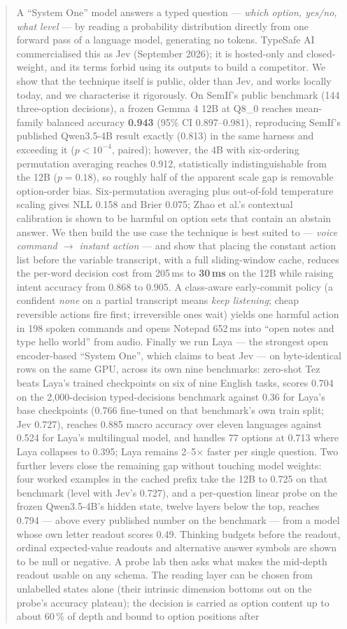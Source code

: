 \documentclass[11pt,a4paper]{article}
\begin{document}
\begin{abstract}
A ``System One'' model answers a typed question --- \emph{which option, yes/no, what level} --- by reading a probability distribution directly from one forward pass of a language model, generating no tokens. TypeSafe AI commercialised this as Jev (September 2026); it is hosted-only and closed-weight, and its terms forbid using its outputs to build a competitor. We show that the technique itself is public, older than Jev, and works locally today, and we characterise it rigorously. On SemIf's public benchmark (144 three-option decisions), a frozen Gemma 4 12B at Q8\_0 reaches mean-family balanced accuracy \textbf{0.943} (95\% CI 0.897--0.981), reproducing SemIf's published Qwen3.5-4B result exactly (0.813) in the same harness and exceeding it ($p<10^{-4}$, paired); however, the 4B with six-ordering permutation averaging reaches 0.912, statistically indistinguishable from the 12B ($p=0.18$), so roughly half of the apparent scale gap is removable option-order bias. Six-permutation averaging plus out-of-fold temperature scaling gives NLL 0.158 and Brier 0.075; Zhao et al.'s contextual calibration is shown to be harmful on option sets that contain an abstain answer. We then build the use case the technique is best suited to --- \emph{voice command $\to$ instant action} --- and show that placing the constant action list before the variable transcript, with a full sliding-window cache, reduces the per-word decision cost from 205\,ms to \textbf{30\,ms} on the 12B while raising intent accuracy from 0.868 to 0.905. A class-aware early-commit policy (a confident \emph{none} on a partial transcript means \emph{keep listening}; cheap reversible actions fire first; irreversible ones wait) yields one harmful action in 198 spoken commands and opens Notepad 652\,ms into ``open notes and type hello world'' from audio. Finally we run Laya --- the strongest open encoder-based ``System One'', which claims to beat Jev --- on byte-identical rows on the same GPU, across its own nine benchmarks: zero-shot Tez beats Laya's trained checkpoints on six of nine English tasks, scores 0.704 on the 2,000-decision typed-decisions benchmark against 0.36 for Laya's base checkpoints (0.766 fine-tuned on that benchmark's own train split; Jev 0.727), reaches 0.885 macro accuracy over eleven languages against 0.524 for Laya's multilingual model, and handles 77 options at 0.713 where Laya collapses to 0.395; Laya remains 2--5$\times$ faster per single question. Two further levers close the remaining gap without touching model weights: four worked examples in the cached prefix take the 12B to 0.725 on that benchmark (level with Jev's 0.727), and a per-question linear probe on the frozen Qwen3.5-4B's hidden state, twelve layers below the top, reaches 0.794 --- above every published number on the benchmark --- from a model whose own letter readout scores 0.49. Thinking budgets before the readout, ordinal expected-value readouts and alternative answer symbols are shown to be null or negative. A probe lab then asks what makes the mid-depth readout usable on any schema. The reading layer can be chosen from unlabelled states alone (their intrinsic dimension bottoms out on the probe's accuracy plateau); the decision is carried as option content up to about 60\,\% of depth and bound to option positions after 
\end{abstract}
\end{document}
